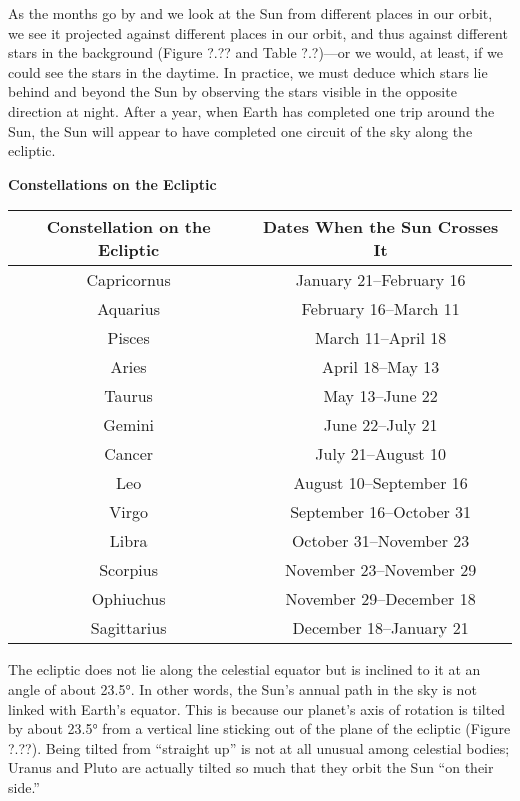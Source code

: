 \documentclass[../../main-astronomy.tex]{subfiles}
\begin{document}
\vspace{1em}

As the months go by and we look at the Sun from different places in our orbit, we see it projected against different places in our orbit, and thus against different stars in the background (Figure ?.?? and Table ?.?)---or we would, at least, if we could see the stars in the daytime. In practice, we must deduce which stars lie behind and beyond the Sun by observing the stars visible in the opposite direction at night. After a year, when Earth has completed one trip around the Sun, the Sun will appear to have completed one circuit of the sky along the ecliptic.


\vspace{1em}

\begin{center}
\textbf{Constellations on the Ecliptic}
    \begin{tabular}{c|c}
        \textbf{Constellation on the Ecliptic} & \textbf{Dates When the Sun Crosses It}\\
        \hline
        Capricornus	& January 21--February 16\\
        Aquarius & February 16--March 11\\
        Pisces & March 11--April 18\\
        Aries & April 18--May 13\\
        Taurus & May 13--June 22\\
        Gemini & June 22--July 21\\
        Cancer & July 21--August 10\\
        Leo & August 10--September 16\\
        Virgo & September 16--October 31\\
        Libra & October 31--November 23\\
        Scorpius & November 23--November 29\\
        Ophiuchus & November 29--December 18\\
        Sagittarius & December 18--January 21\\
        \hline
    \end{tabular}
\end{center}

The ecliptic does not lie along the celestial equator but is inclined to it at an angle of about \ang{23.5}. In other words, the Sun's annual path in the sky is not linked with Earth's equator. This is because our planet's axis of rotation is tilted by about \ang{23.5} from a vertical line sticking out of the plane of the ecliptic (Figure ?.??). Being tilted from ``straight up'' is not at all unusual among celestial bodies; Uranus and Pluto are actually tilted so much that they orbit the Sun ``on their side.''
\end{document}

